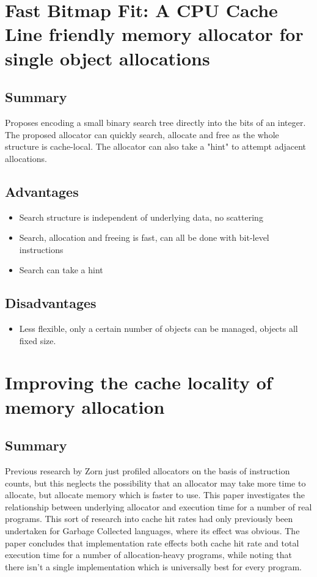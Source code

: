 \documentclass{report}
\begin{document}
\section[Fast Bitmap Fit]{Fast Bitmap Fit: A CPU Cache Line friendly memory allocator for single object allocations \cite{matani2021fastbitmapfitcpu}}
\subsection{Summary}
Proposes encoding a small binary search tree directly into the bits of an integer. The proposed allocator can quickly search, allocate and free as the whole structure is cache-local. The allocator can also take a "hint" to attempt adjacent allocations.
\subsection{Advantages}
\begin{itemize}
	\item{Search structure is independent of underlying data, no scattering}
	\item{Search, allocation and freeing is fast, can all be done with bit-level instructions}
	\item{Search can take a hint}
\end{itemize}

\subsection{Disadvantages}
\begin{itemize}
	\item{Less flexible, only a certain number of objects can be managed, objects all fixed size.}
\end{itemize}

\section[Cache Locality]{Improving the cache locality of memory allocation \cite{10.1145/155090.155107}}
\subsection{Summary}
Previous research by Zorn just profiled allocators on the basis of instruction counts, but this neglects the possibility that an allocator may take more time to allocate, but allocate memory which is faster to use. This paper investigates the relationship between underlying allocator and execution time for a number of real programs. This sort of research into cache hit rates had only previously been undertaken for Garbage Collected languages, where its effect was obvious. The paper concludes that implementation rate effects both cache hit rate and total execution time for a number of allocation-heavy programs, while noting that there isn't a single implementation which is universally best for every program.
\end{document}

